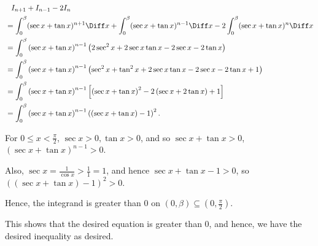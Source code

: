 \begin{enumerate}
          \begin{align*}
               & \phantom{=} I_{n + 1} + I_{n - 1} - 2 I_n                                                                                                                    \\
               & = \int_{0}^{\beta} (\sec x + \tan x)^{n + 1} \Diff x + \int_{0}^{\beta} (\sec x + \tan x)^{n - 1} \Diff x - 2 \int_{0}^{\beta} (\sec x + \tan x)^{n} \Diff x \\
               & = \int_{0}^{\beta} \left(\sec x + \tan x\right)^{n - 1} \left(2 \sec^2 x + 2 \sec x \tan x - 2 \sec x - 2 \tan x\right)                                      \\
               & = \int_{0}^{\beta} \left(\sec x + \tan x\right)^{n - 1} \left(\sec^2 x + \tan^2 x + 2 \sec x \tan x - 2 \sec x - 2 \tan x + 1 \right)                        \\
               & = \int_{0}^{\beta} \left(\sec x + \tan x\right)^{n - 1} \left[\left(\sec x + \tan x\right)^2 - 2 \left(\sec x + 2 \tan x\right) + 1\right]                   \\
               & = \int_{0}^{\beta} \left(\sec x + \tan x\right)^{n - 1} \left(\left(\sec x + \tan x\right) - 1\right)^2.
          \end{align*}

          For \(0 \leq x < \frac{\pi}{2}\), \(\sec x > 0, \tan x > 0\), and so \(\sec x + \tan x > 0\), \(\left(\sec x + \tan x\right)^{n - 1} > 0\).

          Also, \(\sec x = \frac{1}{\cos x} > \frac{1}{1} = 1\), and hence \(\sec x + \tan x - 1 > 0\), so \(\left(\left(\sec x + \tan x\right) - 1\right)^2 > 0\).

          Hence, the integrand is greater than \(0\) on \((0, \beta) \subseteq \left(0, \frac{\pi}{2}\right)\).

          This shows that the desired equation is greater than \(0\), and hence, we have the desired inequality as desired.


\end{enumerate}
